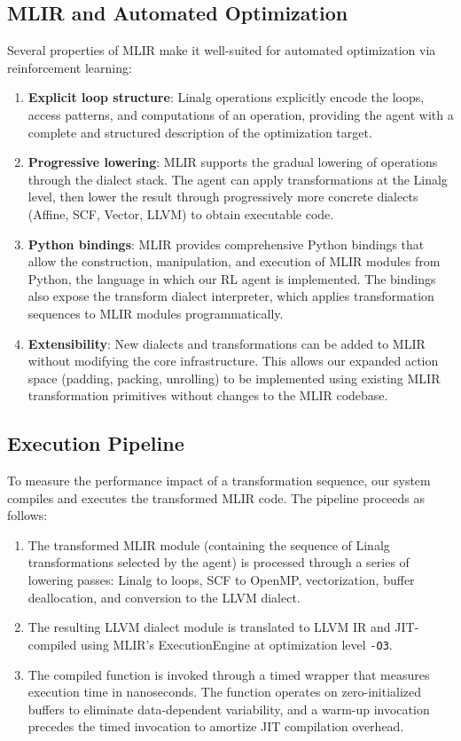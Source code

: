 \subsection{MLIR and Automated Optimization}

Several properties of MLIR make it well-suited for automated optimization via reinforcement learning:

\begin{enumerate}
    \item \textbf{Explicit loop structure}: Linalg operations explicitly encode the loops, access patterns, and computations of an operation, providing the agent with a complete and structured description of the optimization target.
    \item \textbf{Progressive lowering}: MLIR supports the gradual lowering of operations through the dialect stack. The agent can apply transformations at the Linalg level, then lower the result through progressively more concrete dialects (Affine, SCF, Vector, LLVM) to obtain executable code.
    \item \textbf{Python bindings}: MLIR provides comprehensive Python bindings that allow the construction, manipulation, and execution of MLIR modules from Python, the language in which our RL agent is implemented. The bindings also expose the transform dialect interpreter, which applies transformation sequences to MLIR modules programmatically.
    \item \textbf{Extensibility}: New dialects and transformations can be added to MLIR without modifying the core infrastructure. This allows our expanded action space (padding, packing, unrolling) to be implemented using existing MLIR transformation primitives without changes to the MLIR codebase.
\end{enumerate}

\subsection{Execution Pipeline}

To measure the performance impact of a transformation sequence, our system compiles and executes the transformed MLIR code. The pipeline proceeds as follows:

\begin{enumerate}
    \item The transformed MLIR module (containing the sequence of Linalg transformations selected by the agent) is processed through a series of lowering passes: Linalg to loops, SCF to OpenMP, vectorization, buffer deallocation, and conversion to the LLVM dialect.
    \item The resulting LLVM dialect module is translated to LLVM IR and JIT-compiled using MLIR's ExecutionEngine at optimization level \texttt{-O3}.
    \item The compiled function is invoked through a timed wrapper that measures execution time in nanoseconds. The function operates on zero-initialized buffers to eliminate data-dependent variability, and a warm-up invocation precedes the timed invocation to amortize JIT compilation overhead.
\end{enumerate}

